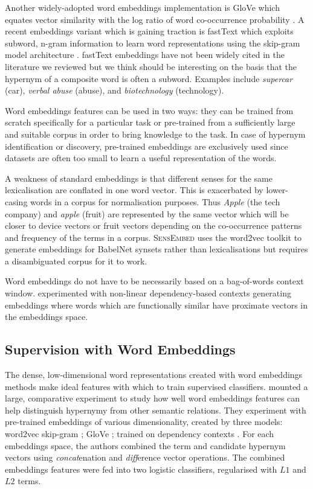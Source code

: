 Another widely-adopted word embeddings implementation is GloVe which equates vector similarity with the log ratio of word co-occurrence probability \citep{pennington2014glove}.  A recent embeddings variant which is gaining traction is fastText which exploits subword, n-gram information to learn word representations using the skip-gram model architecture \citep{bojanowski2017enriching}.  fastText embeddings have not been widely cited in the literature we reviewed but we think should be interesting on the basis that the hypernym of a composite word is often a subword.  Examples include \textit{supercar} (car), \textit{verbal abuse} (abuse), and \textit{biotechnology} (technology).

Word embeddings features can be used in two ways: they can be trained from scratch specifically for a particular task or pre-trained from a sufficiently large and suitable corpus in order to bring knowledge to the task.  In case of hypernym identification or discovery, pre-trained embeddings are exclusively used since datasets are often too small to learn a useful representation of the words.

A weakness of standard embeddings is that different senses for the same lexicalisation are conflated in one word vector.  This is exacerbated by lower-casing words in a corpus for normalisation purposes.  Thus \textit{Apple} (the tech company) and \textit{apple} (fruit) are represented by the same vector which will be closer to device vectors or fruit vectors depending on the co-occurrence patterns and frequency of the terms in a corpus.  \textsc{SensEmbed} \citep{iacobacci2015sensembed} uses the word2vec toolkit to generate embeddings for BabelNet \citep{navigli2012babelnet} synsets rather than lexicalisations but requires a disambiguated corpus for it to work.  

Word embeddings do not have to be necessarily based on a bag-of-words context window.  \citet{levy2014dependency} experimented with non-linear dependency-based contexts generating embeddings where words which are functionally similar have proximate vectors in the embeddings space.

\subsection{Supervision with Word Embeddings} \label{supervised_embeddings}
The dense, low-dimensional word representations created with word embeddings methods make ideal features with which to train supervised classifiers.  \citet{shwartz2017siege} mounted a large, comparative experiment to study how well word embeddings features can help distinguish hypernymy from other semantic relations.  They experiment with pre-trained embeddings of various dimensionality, created by three models: word2vec skip-gram \citep{mikolov2013distributed}; GloVe \citep{pennington2014glove}; trained on dependency contexts \citep{levy2014dependency}.  For each embeddings space, the authors combined the term and candidate hypernym vectors using \textit{concat}enation \citep{baroni2012entailment} and \textit{diff}erence \citep{roller2014inclusive} vector operations.  The combined embeddings features were fed into two logistic classifiers, regularised with $L1$ and $L2$ terms.

